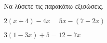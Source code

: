Να λύσετε τις παρακάτω εξισώσεις.
\begin{multicols}{2}
\begin{alist}
\item $ 2(x+4)-4x=5x-(7-2x) $
\item $ 3(1-3x)+5=12-7x $
\end{alist}
\end{multicols}
